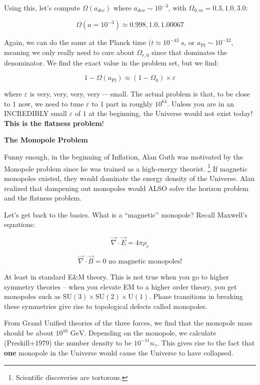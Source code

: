 \documentclass{article}
\newcommand{\be}{\begin{equation}}
\newcommand{\ee}{\end{equation}}
\begin{document}
Using this, let's compute $\Omega(a_{dec})$ where $a_{dex} \sim 10^{-3}$, with $\Omega_{0,m}= 0.3, 1.0, 3.0$:

\begin{equation}
    \Omega(a = 10^{-3}) \approx 0.998, 1.0, 1.00067
\end{equation}

Again, we can do the same at the Planck time ($t \approx 10^{-43} \text{ s}$, or $a_\text{Pl} \sim 10^{-32}$, meaning we only really need to care about $\Omega_{r,0}$ since that dominates the denominator. We find the exact value in the problem set, but we find:

\be
1 - \Omega(a_\text{Pl}) \approx (1 - \Omega_0) \times \varepsilon
\ee

where $\varepsilon$ is very, very, very, very $\cdots$ small. The actual problem is that, to be close to $1$ now, we need to tune $\varepsilon$ to 1 part in roughly $10^{64}$. Unless you are in an INCREDIBLY small $\varepsilon$ of $1$ at the beginning, the Universe would not exist today! \textbf{This is the flatness problem}! 

\noindent\textbf{The Monopole Problem}

Funny enough, in the beginning of Inflation, Alan Guth was motivated by the Monopole problem since he was trained as a high-energy theorist. \footnote{Scientific discoveries are tortorous.} If magnetic monopoles existed, they would dominate the energy density of the Universe. Alan realized that dampening out monopoles would ALSO solve the horizon problem and the flatness problem. 

Let's get back to the basics. What is a ``magnetic'' monopole? Recall Maxwell's equations:

\be
\vec{\nabla} \cdot \vec{E} = 4\pi \rho_e
\ee

\be
\vec{\nabla} \cdot \vec{B} = 0 \text{ no magnetic monopoles!}
\ee

At least in standard E\&M theory. This is not true when you go to higher symmetry theories -- when you elevate EM to a higher order theory, you get monopoles such as $\text{SU}(3) \times \text{SU}(2) \times \text{U}(1)$. Phase transitions in breaking these symmetries give rise to topological defects called monopoles.

From Grand Unified theories of the three forces, we find that the monopole mass should be about $10^{16} \text{ GeV}$. Depending on the monopole, we calculate (Preskill+1979) the number density to be $10^{-11} n_\gamma$. This gives rise to the fact that \textbf{one} monopole in the Universe would cause the Universe to have collapsed. 
\end{document}
